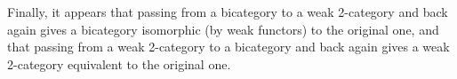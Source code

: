 Finally, it appears that passing from a bicategory to a weak 2-category and
back again gives a bicategory isomorphic (by weak functors) to the original
one, and that passing from a weak 2-category to a bicategory and back again
gives a weak 2-category equivalent to the original one.


\clearpage









